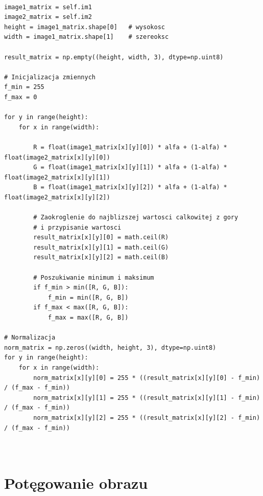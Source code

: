 \documentclass[final,a4paper,openany,12pt]{mwbk}
\begin{document}
\begin{lstlisting}[caption=Mieszanie obrazów barwowych z określonym współczynnikiem]

image1_matrix = self.im1
image2_matrix = self.im2
height = image1_matrix.shape[0]   # wysokosc
width = image1_matrix.shape[1]    # szereoksc

result_matrix = np.empty((height, width, 3), dtype=np.uint8)

# Inicjalizacja zmiennych
f_min = 255
f_max = 0

for y in range(height):
    for x in range(width):  

        R = float(image1_matrix[x][y][0]) * alfa + (1-alfa) * float(image2_matrix[x][y][0])
        G = float(image1_matrix[x][y][1]) * alfa + (1-alfa) * float(image2_matrix[x][y][1])
        B = float(image1_matrix[x][y][2]) * alfa + (1-alfa) * float(image2_matrix[x][y][2])

        # Zaokroglenie do najblizszej wartosci calkowitej z gory
        # i przypisanie wartosci
        result_matrix[x][y][0] = math.ceil(R)
        result_matrix[x][y][1] = math.ceil(G)
        result_matrix[x][y][2] = math.ceil(B)

        # Poszukiwanie minimum i maksimum                
        if f_min > min([R, G, B]):
            f_min = min([R, G, B])
        if f_max < max([R, G, B]):
            f_max = max([R, G, B])

# Normalizacja
norm_matrix = np.zeros((width, height, 3), dtype=np.uint8)
for y in range(height):
    for x in range(width):
        norm_matrix[x][y][0] = 255 * ((result_matrix[x][y][0] - f_min) / (f_max - f_min))
        norm_matrix[x][y][1] = 255 * ((result_matrix[x][y][1] - f_min) / (f_max - f_min))
        norm_matrix[x][y][2] = 255 * ((result_matrix[x][y][2] - f_min) / (f_max - f_min))

    

\end{lstlisting}

\section{ Potęgowanie obrazu}

\hfill
\\\\
\indent
\end{document}
